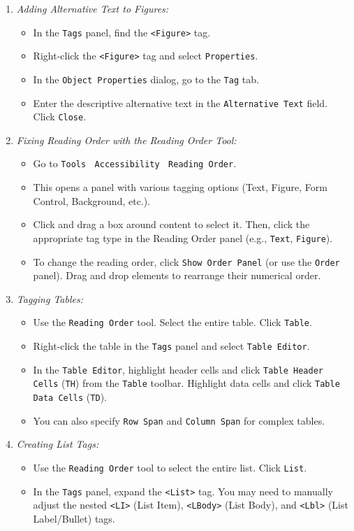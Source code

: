 \begin{itemize}
\begin{enumerate}
\begin{itemize}
    \end{itemize}
\item \emph{Adding Alternative Text to Figures:}
    \begin{itemize}
    \item In the \texttt{Tags} panel, find the \texttt{<Figure>} tag.
    \item Right-click the \texttt{<Figure>} tag and select \texttt{Properties}.
    \item In the \texttt{Object Properties} dialog, go to the \texttt{Tag} tab.
    \item Enter the descriptive alternative text in the \texttt{Alternative Text} field. Click \texttt{Close}.
    \end{itemize}
\item \emph{Fixing Reading Order with the Reading Order Tool:}
    \begin{itemize}
    \item Go to \texttt{Tools} $\>$ \texttt{Accessibility} $\>$ \texttt{Reading Order}.
    \item This opens a panel with various tagging options (Text, Figure, Form Control, Background, etc.).
    \item Click and drag a box around content to select it. Then, click the appropriate tag type in the Reading Order panel (e.g., \texttt{Text}, \texttt{Figure}).
    \item To change the reading order, click \texttt{Show Order Panel} (or use the \texttt{Order} panel). Drag and drop elements to rearrange their numerical order.
    \end{itemize}
\item \emph{Tagging Tables:}
    \begin{itemize}
    \item Use the \texttt{Reading Order} tool. Select the entire table. Click \texttt{Table}.
    \item Right-click the table in the \texttt{Tags} panel and select \texttt{Table Editor}.
    \item In the \texttt{Table Editor}, highlight header cells and click \texttt{Table Header Cells} (\texttt{TH}) from the \texttt{Table} toolbar. Highlight data cells and click \texttt{Table Data Cells} (\texttt{TD}).
    \item You can also specify \texttt{Row Span} and \texttt{Column Span} for complex tables.
    \end{itemize}
\item \emph{Creating List Tags:}
    \begin{itemize}
    \item Use the \texttt{Reading Order} tool to select the entire list. Click \texttt{List}.
    \item In the \texttt{Tags} panel, expand the \texttt{<List>} tag. You may need to manually adjust the nested \texttt{<LI>} (List Item), \texttt{<LBody>} (List Body), and \texttt{<Lbl>} (List Label/Bullet) tags.
    \end{itemize}
\end{enumerate}


\end{itemize}
